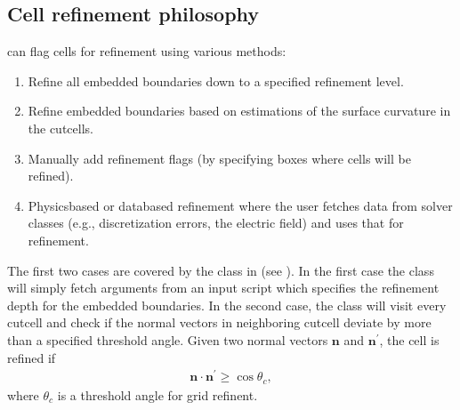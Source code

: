 \documentclass[letterpaper,10pt,english]{sphinxmanual}
\begin{document}
\subsection{Cell refinement philosophy}
\label{\detokenize{Source/SpatialDiscretization:cell-refinement-philosophy}}\label{\detokenize{Source/SpatialDiscretization:chap-refinementphilosophy}}
\sphinxAtStartPar
{} can flag cells for refinement using various methods:
\begin{enumerate}
%
\item {} 
\sphinxAtStartPar
Refine all embedded boundaries down to a specified refinement level.

\item {} 
\sphinxAtStartPar
Refine embedded boundaries based on estimations of the surface curvature in the cut\sphinxhyphen{}cells.

\item {} 
\sphinxAtStartPar
Manually add refinement flags (by specifying boxes where cells will be refined).

\item {} 
\sphinxAtStartPar
Physics\sphinxhyphen{}based or data\sphinxhyphen{}based refinement where the user fetches data from solver classes (e.g., discretization errors, the electric field) and uses that for refinement.

\end{enumerate}

\sphinxAtStartPar
The first two cases are covered by the  class in  (see {\hyperref[\detokenize{Source/Driver:chap-driver}]{}}).
In the first case the  class will simply fetch arguments from an input script which specifies the refinement depth for the embedded boundaries.
In the second case, the  class will visit every cut\sphinxhyphen{}cell and check if the normal vectors in neighboring cut\sphinxhyphen{}cell deviate by more than a specified threshold angle.
Given two normal vectors \(\mathbf{n}\) and \(\mathbf{n}^\prime\), the cell is refined if
\begin{equation*}
\begin{split}\mathbf{n}\cdot\mathbf{n}^\prime \geq \cos\theta_c,\end{split}
\end{equation*}
\sphinxAtStartPar
where \(\theta_c\) is a threshold angle for grid refinent.
\end{document}
